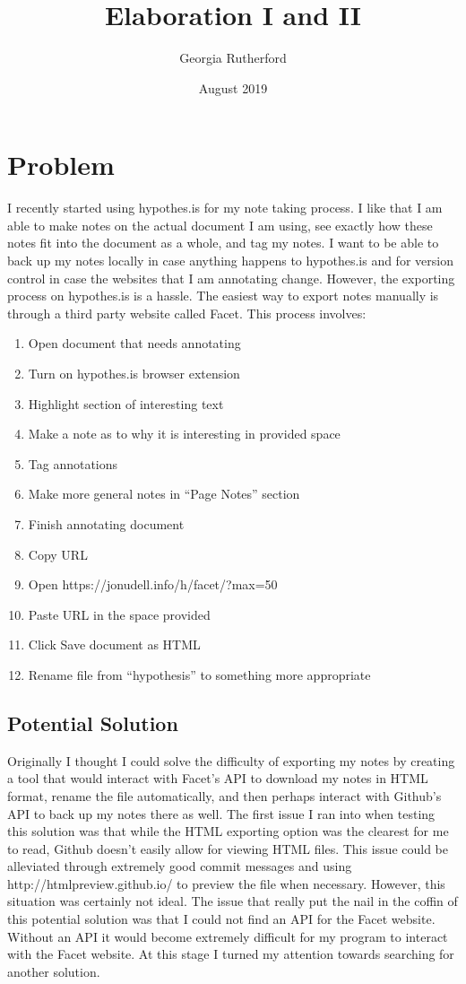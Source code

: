 \documentclass{article}
\title{Elaboration I and II}
\author{Georgia Rutherford}
\date{August 2019}
\begin{document}
\maketitle

\section{Problem}
I recently started using hypothes.is for my note taking process. I like that I am able to make notes on the actual document I am using, see exactly how these notes fit into the document as a whole, and tag my notes. I want to be able to back up my notes locally in case anything happens to hypothes.is and for version control in case the websites that I am annotating change. However, the exporting process on hypothes.is is a hassle. 
\newline
The easiest way to export notes manually is through a third party website called Facet. This process involves:
\begin{enumerate}
\item Open document that needs annotating
\item Turn on hypothes.is browser extension
\item Highlight section of interesting text
\item Make a note as to why it is interesting in provided space
\item Tag annotations 
\item Make more general notes in “Page Notes” section
\item Finish annotating document
\item Copy URL
\item Open https://jonudell.info/h/facet/?max=50
\item Paste URL in the space provided
\item Click Save document as HTML
\item Rename file from “hypothesis” to something more appropriate
\end{enumerate}

\subsection{Potential Solution}
Originally I thought I could solve the difficulty of exporting my notes by creating a tool that would interact with Facet's API to download my notes in HTML format, rename the file automatically, and then perhaps interact with Github's API to back up my notes there as well. The first issue I ran into when testing this solution was that while the HTML exporting option was the clearest for me to read, Github doesn't easily allow for viewing HTML files. This issue could be alleviated through extremely good commit messages and using http://htmlpreview.github.io/  to preview the file when necessary. However, this situation was certainly not ideal. The issue that really put the nail in the coffin of this potential solution was that I could not find an API for the Facet website. Without an API it would become extremely difficult for my program to interact with the Facet website. At this stage I turned my attention towards searching for another solution.
\end{document}
